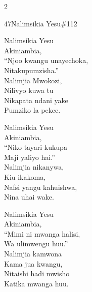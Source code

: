 \begin{multicols}{2}
\begin{hymn}{47}{Nalimsikia Yesu}{\#112}
\begin{stanza}
Nalimsikia Yesu\\
Akiniambia,\\
``Njoo kwangu unayechoka,\\
Nitakupumzisha.''\\
Nalimjia Mwokozi,\\
Nilivyo kuwa tu\\
Nikapata ndani yake\\
Pumziko la pekee.
\end{stanza}
\begin{stanza}
Nalimsikia Yesu\\
Akiniambia,\\
``Niko tayari kukupa\\
Maji yaliyo hai.''\\
Nalimjia nikanywa,\\
Kiu ikakoma,\\
Nafsi yangu kahuishwa,\\
Nina uhai wake.
\end{stanza}
\begin{stanza}
Nalimsikia Yesu\\
Akiniambia,\\
``Mimi ni mwanga halisi,\\
Wa ulimwengu huu.''\\
Nalimjia kamwona\\
Kama jua kwangu,\\
Nitaishi hadi mwisho\\
Katika mwanga huu.
\end{stanza}
\end{hymn}


\end{multicols}
